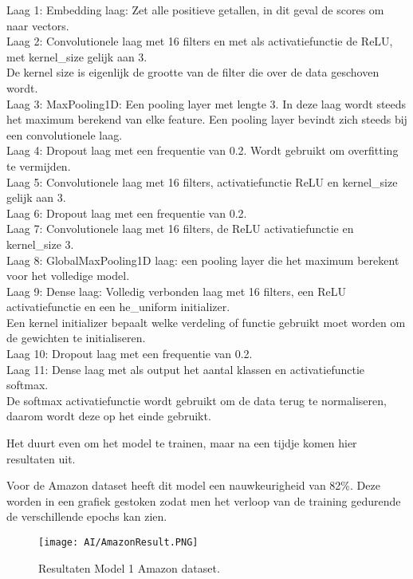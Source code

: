 Laag 1: Embedding laag: Zet alle positieve getallen, in dit geval de scores om naar vectors. \\
Laag 2: Convolutionele laag met 16 filters en met als activatiefunctie de ReLU, met kernel\_size gelijk aan 3. \\
De kernel size is eigenlijk de grootte van de filter die over de data geschoven wordt. \\
Laag 3: MaxPooling1D: Een pooling layer met lengte 3. In deze laag wordt steeds het maximum berekend van elke feature. Een pooling layer bevindt zich steeds bij een convolutionele laag. \\
Laag 4: Dropout laag met een frequentie van 0.2. Wordt gebruikt om overfitting te vermijden. \\
Laag 5: Convolutionele laag met 16 filters, activatiefunctie ReLU en kernel\_size gelijk aan 3. \\
Laag 6: Dropout laag met een frequentie van 0.2. \\
Laag 7: Convolutionele laag met 16 filters, de ReLU activatiefunctie en kernel\_size 3. \\
Laag 8: GlobalMaxPooling1D laag: een pooling layer die het maximum berekent voor het volledige model. \\
Laag 9: Dense laag: Volledig verbonden laag met 16 filters, een ReLU activatiefunctie en een he\_uniform initializer. \\
Een kernel initializer bepaalt welke verdeling of functie gebruikt moet worden om de gewichten te initialiseren. \\
Laag 10: Dropout laag met een frequentie van 0.2. \\
Laag 11: Dense laag met als output het aantal klassen en activatiefunctie \gls{softmax}. \\
De softmax activatiefunctie wordt gebruikt om de data terug te normaliseren, daarom wordt deze op het einde gebruikt.   

Het duurt even om het model te trainen, maar na een tijdje komen hier resultaten uit. 

Voor de Amazon dataset heeft dit model een nauwkeurigheid van 82\%. Deze worden in een grafiek gestoken zodat men het verloop van de training gedurende de verschillende epochs kan zien. 

\begin{figure}[!htbp]
    \texttt{[image: AI/AmazonResult.PNG]}
    \caption{\label{amazonresult}Resultaten Model 1 Amazon dataset.}
\end{figure}
\FloatBarrier

